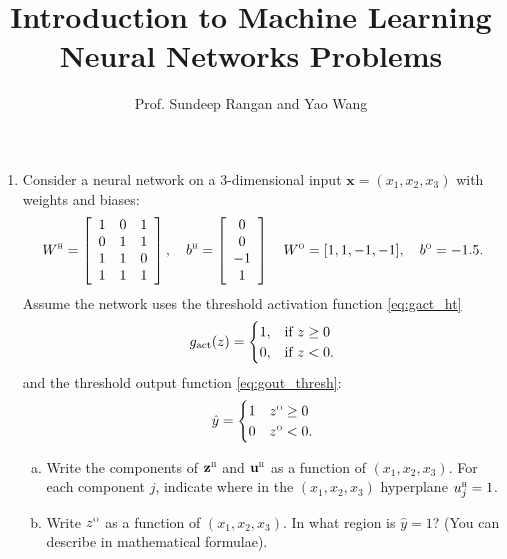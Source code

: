 \documentclass[11pt]{article}
\def\beq{\begin{equation}}
\def\eeq{\end{equation}}
\newcommand{\ubf}{\mathbf{u}}
\newcommand{\xbf}{\mathbf{x}}
\newcommand{\zbf}{\mathbf{z}}
\def\hid{\textsc{\tiny H}}
\def\out{\textsc{\tiny O}}
\begin{document}
\title{Introduction to Machine Learning\\
Neural Networks Problems}
\author{Prof. Sundeep Rangan and Yao Wang}
\date{}

\maketitle


\begin{enumerate}



\item Consider a neural network
on a 3-dimensional input $\xbf=(x_1,x_2, x_3)$ with weights and biases:
\[
    W^\hid = \left[ \begin{array}{ccc} 1 & 0 & 1  \\ 0 & 1  & 1 \\ 1 & 1 & 0 \\ 1 & 1 & 1\\ \end{array} \right], \quad
    b^\hid = \left[ \begin{array}{c} 0 \\ 0 \\ -1 \\ 1 \end{array} \right] \quad
    W^\out = [1, 1, -1, -1], \quad b^\out = -1.5.
\]
Assume the network uses the
threshold activation function \eqref{eq:gact_ht}
\beq \label{eq:gact_ht}
    g_{\rm act}(z) = \begin{cases}
        1, & \mbox{if } z \geq 0 \\
        0, & \mbox{if } z < 0.
        \end{cases}
\eeq
 and the
threshold output function \eqref{eq:gout_thresh}:
\beq \label{eq:gout_thresh}
    \hat{y} =  \begin{cases}
        1 & z^\out \geq 0 \\
        0 & z^\out < 0.
        \end{cases}
\eeq



\begin{enumerate}[(a)]
\item Write the components of $\zbf^\hid$ and $\ubf^\hid$ as a function
of $(x_1,x_2, x_3)$.  For each component $j$, indicate where in the $(x_1,x_2, x_3)$
hyperplane $u^\hid_j=1$.

\item Write $z^\out$ as a function of $(x_1,x_2, x_3)$.  In what region is
$\hat{y}=1$? (You can describe in mathematical formulae).
\end{enumerate}




\end{enumerate}
\end{document}

